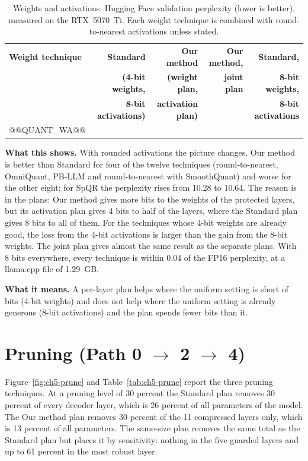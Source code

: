 \begin{table}[htbp]
\centering
\small
\caption{Weights and activations: Hugging Face validation perplexity (lower is better), measured on the RTX~5070~Ti. Each weight technique is combined with round-to-nearest activations unless stated.}
\label{tab:ch5-quant-wa}
\renewcommand{\arraystretch}{1.15}
\begin{tabularx}{\textwidth}{Xrrrr}
\hline
\textbf{Weight technique} & \textbf{Standard} & \textbf{Our method} & \textbf{Our method,} & \textbf{Standard,} \\
 & \textbf{(4-bit weights,} & \textbf{(weight plan,} & \textbf{joint plan} & \textbf{8-bit weights,} \\
 & \textbf{8-bit activations)} & \textbf{activation plan)} & & \textbf{8-bit activations} \\
\hline
@@QUANT_WA@@
\hline
\end{tabularx}
\end{table}

\textbf{What this shows.} With rounded activations the picture changes. Our method is better than Standard for four of the twelve techniques (round-to-nearest, OmniQuant, PB-LLM and round-to-nearest with SmoothQuant) and worse for the other eight; for SpQR the perplexity rises from 10.28 to 10.64. The reason is in the plans: Our method gives more bits to the weights of the protected layers, but its activation plan gives 4 bits to half of the layers, where the Standard plan gives 8 bits to all of them. For the techniques whose 4-bit weights are already good, the loss from the 4-bit activations is larger than the gain from the 8-bit weights. The joint plan gives almost the same result as the separate plans. With 8 bits everywhere, every technique is within 0.04 of the FP16 perplexity, at a llama.cpp file of 1.29~GB.

\textbf{What it means.} A per-layer plan helps where the uniform setting is short of bits (4-bit weights) and does not help where the uniform setting is already generous (8-bit activations) and the plan spends fewer bits than it.

\section{Pruning (Path 0 $\rightarrow$ 2 $\rightarrow$ 4)}
\label{sec:ch5-prune}

Figure~\ref{fig:ch5-prune} and Table~\ref{tab:ch5-prune} report the three pruning techniques. At a pruning level of 30 percent the Standard plan removes 30 percent of every decoder layer, which is 26 percent of all parameters of the model. The Our method plan removes 30 percent of the 11 compressed layers only, which is 13 percent of all parameters. The same-size plan removes the same total as the Standard plan but places it by sensitivity: nothing in the five guarded layers and up to 61 percent in the most robust layer.

